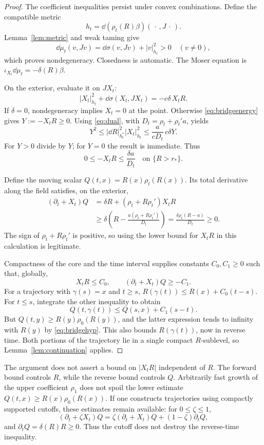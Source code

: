 \begin{proof}
The coefficient inequalities persist under convex combinations.
Define the compatible metric
\[
 h_t=\dd(\rho_t(R)\beta)(\,\cdot\,,J\,\cdot\,).
\]
Lemma~\ref{lem:metric} and weak taming give
\[
 \dd\mu_t(v,Jv)=\dd\sigma(v,Jv)+|v|_{h_t}^2>0\quad(v\ne0),
\]
which proves nondegeneracy. Closedness is automatic.
The Moser equation is $\iota_{X_t}\dd\mu_t=-\delta(R)\beta$.

On the exterior, evaluate it on $JX_t$:
\begin{equation}\label{eq:bridgeenergy}
 |X_t|_{h_t}^2+\dd\sigma(X_t,JX_t)
   =-c\delta\,X_tR .
\end{equation}
If $\delta=0$, nondegeneracy implies $X_t=0$ at the point.
Otherwise \eqref{eq:bridgeenergy} gives $Y:=-X_tR\ge0$.
Using \eqref{eq:dual}, with $D_t=\rho_t+\rho_t'a$, yields
\[
 Y^2\le|\dd R|_{h_t^*}^2|X_t|_{h_t}^2
 \le\frac{a}{cD_t}\,c\delta Y .
\]
For $Y>0$ divide by $Y$; for $Y=0$ the result is immediate.
Thus
\begin{equation}\label{eq:radialdrift}
 0\le-X_tR\le\frac{\delta a}{D_t}
 \quad\text{on }\{R>r_*\}.
\end{equation}

Define the moving scalar $Q(t,x)=R(x)\rho_t(R(x))$.
Its total derivative along the field satisfies, on the exterior,
\begin{align}
 (\partial_t+X_t)Q
 &=\delta R+(\rho_t+R\rho_t')X_tR\nonumber\\
 &\ge\delta\left(R-\frac{a(\rho_t+R\rho_t')}{D_t}\right)
 =\frac{\delta\rho_t(R-a)}{D_t}\ge0 .
 \label{eq:movingbarrier}
\end{align}
The sign of $\rho_t+R\rho_t'$ is positive, so using the lower
bound for $X_tR$ in this calculation is legitimate.

Compactness of the core and the time interval supplies constants
$C_0,C_1\ge0$ such that, globally,
\[
 X_tR\le C_0,\qquad (\partial_t+X_t)Q\ge-C_1 .
\]
For a trajectory with $\gamma(s)=x$ and $t\ge s$,
$R(\gamma(t))\le R(x)+C_0(t-s)$.
For $t\le s$, integrate the other inequality to obtain
\[
 Q(t,\gamma(t))\le Q(s,x)+C_1(s-t).
\]
But $Q(t,y)\ge R(y)\rho_0(R(y))$, and the latter expression
tends to infinity with $R(y)$ by \eqref{eq:bridgehyp}.
This also bounds $R(\gamma(t))$, now in reverse time.
Both portions of the trajectory lie in a single compact
$R$-sublevel, so Lemma~\ref{lem:continuation} applies.
\end{proof}

\begin{remark}
The argument does not assert a bound on $|X_tR|$ independent of
$R$. The forward bound controls $R$, while the reverse bound controls
$Q$. Arbitrarily fast growth of the upper coefficient $\rho_1$
does not spoil the lower estimate
$Q(t,x)\ge R(x)\rho_0(R(x))$.
If one constructs trajectories using compactly supported cutoffs,
these estimates remain available: for $0\le\zeta\le1$,
\[
 (\partial_t+\zeta X_t)Q
 =\zeta(\partial_t+X_t)Q+(1-\zeta)\partial_tQ,
\]
and $\partial_tQ=\delta(R)R\ge0$. Thus the cutoff does not
destroy the reverse-time inequality.
\end{remark}

